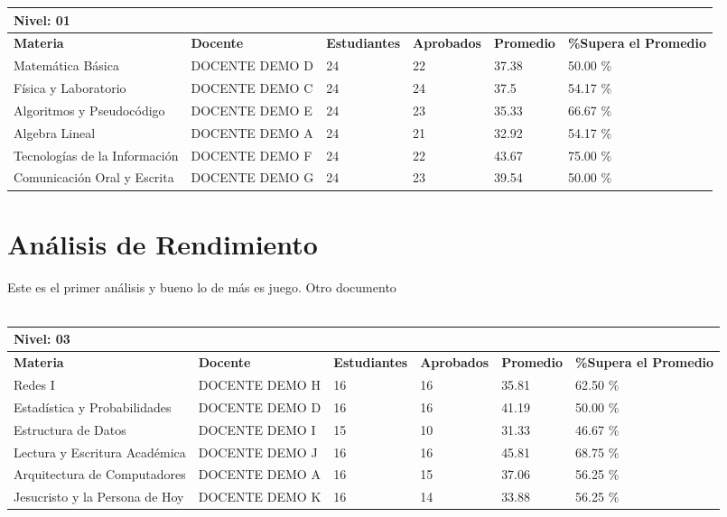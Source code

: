 \small
\begin{tabularx}{\textwidth}{|p{2.5cm}|p{2.5cm}|X|X|X|X|}
\hline
\multicolumn{6}{|X|}{\textbf{Nivel: 01 }}\\\hline\textbf{Materia} & \textbf{Docente} & \textbf{Estudiantes} & \textbf{Aprobados} & \textbf{Promedio} & \textbf{\%Supera el Promedio} \\ \hline
Matemática Básica & DOCENTE DEMO D & 24 & 22 & 37.38 & 50.00 \%\\ \hline
Física y Laboratorio & DOCENTE DEMO C & 24 & 24 & 37.5 & 54.17 \%\\ \hline
Algoritmos y Pseudocódigo & DOCENTE DEMO E & 24 & 23 & 35.33 & 66.67 \%\\ \hline
Algebra Lineal & DOCENTE DEMO A & 24 & 21 & 32.92 & 54.17 \%\\ \hline
Tecnologías de la Información  & DOCENTE DEMO F & 24 & 22 & 43.67 & 75.00 \%\\ \hline
Comunicación Oral y Escrita & DOCENTE DEMO G & 24 & 23 & 39.54 & 50.00 \%\\ \hline
\end{tabularx}

\vspace{1cm}
\section{Análisis de Rendimiento}
Este es el primer análisis y bueno lo de más es juego.
Otro documento\\
\vspace{1cm}\\\small
\begin{tabularx}{\textwidth}{|p{2.5cm}|p{2.5cm}|X|X|X|X|}
\hline
\multicolumn{6}{|X|}{\textbf{Nivel: 03 }}\\\hline\textbf{Materia} & \textbf{Docente} & \textbf{Estudiantes} & \textbf{Aprobados} & \textbf{Promedio} & \textbf{\%Supera el Promedio} \\ \hline
Redes I & DOCENTE DEMO H & 16 & 16 & 35.81 & 62.50 \%\\ \hline
Estadística y Probabilidades & DOCENTE DEMO D & 16 & 16 & 41.19 & 50.00 \%\\ \hline
Estructura de Datos & DOCENTE DEMO I & 15 & 10 & 31.33 & 46.67 \%\\ \hline
Lectura y Escritura Académica & DOCENTE DEMO J  & 16 & 16 & 45.81 & 68.75 \%\\ \hline
Arquitectura de Computadores & DOCENTE DEMO A & 16 & 15 & 37.06 & 56.25 \%\\ \hline
Jesucristo y la Persona de Hoy & DOCENTE DEMO K & 16 & 14 & 33.88 & 56.25 \%\\ \hline
\end{tabularx}

